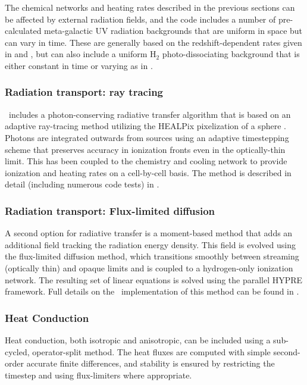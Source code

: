 The chemical networks and heating rates described in the previous
sections can be affected by external radiation fields, and the code
includes a number of pre-calculated meta-galactic UV radiation
backgrounds that are uniform in space but can vary in time.  These are
generally based on the redshift-dependent rates given in
\citet{1996ApJ...461...20H} and \citet{2012ApJ...746..125H}, but can
also include a uniform H$_2$ photo-dissociating background that is
either constant in time or varying as in \citet{WiseAbel05}.

\subsubsection{Radiation transport: ray tracing}

\enzo\ includes a photon-conserving radiative transfer algorithm that
is based on an adaptive ray-tracing method utilizing the HEALPix
pixelization of a sphere \citep{AbelWandelt02}. Photons are integrated
outwards from sources using an adaptive timestepping scheme that
preserves accuracy in ionization fronts even in the optically-thin
limit. This has been coupled to the chemistry and cooling network to
provide ionization and heating rates on a cell-by-cell basis. The
method is described in detail (including numerous code tests) in
\citet{Wise11_Moray}.

\subsubsection{Radiation transport: Flux-limited diffusion}

A second option for radiative transfer is a moment-based method that
adds an additional field tracking the radiation energy density.  This
field is evolved using the flux-limited diffusion method, which
transitions smoothly between streaming (optically thin) and opaque
limits and is coupled to a hydrogen-only ionization network.  The
resulting set of linear equations is solved using the parallel HYPRE
framework.  Full details on the \enzo\ implementation of this method
can be found in \citet{ReynoldsHayesPaschosNorman2009}.

\subsubsection{Heat Conduction}

Heat conduction, both isotropic and anisotropic, can be included using
a sub-cycled, operator-split method.  The heat fluxes are computed
with simple second-order accurate finite differences, and stability is
ensured by restricting the timestep and using flux-limiters where
appropriate.

